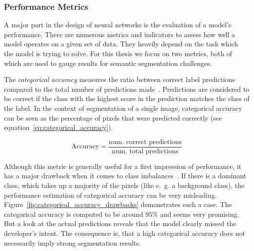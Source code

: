 \subsubsection{Performance Metrics}
\label{sec:metrics}
A major part in the design of neural networks is the evaluation of a model's performance. There are numerous metrics and indicators to assess how well a model operates on a given set of data. They heavily depend on the task which the model is trying to solve. For this thesis we focus on two metrics, both of which are used to gauge results for semantic segmentation challenges.

The \emph{categorical accuracy} measures the ratio between correct label predictions compared to the total number of predictions made~\cite{tf_whitepaper15}. Predictions are considered to be correct if the class with the highest score in the prediction matches the class of the label. In the context of segmentation of a single image, categorical accuracy can be seen as the percentage of pixels that were predicted correctly (see equation~\ref{eq:categorical_accuracy}).

\begin{equation}
    \label{eq:categorical_accuracy}
    \text{Accuracy} = \frac{\text{num. correct predictions}}{\text{num. total predictions}}
\end{equation}

Although this metric is generally useful for a first impression of performance, it has a major drawback when it comes to class imbalances~\cite{tds_segmentation18}. If there is a dominant class, which takes up a majority of the pixels (like e.~g. a background class), the performance estimation of categorical accuracy can be very misleading. Figure~\ref{fig:categorical_accuracy_drawbacks} demonstrates such a case. The categorical accuracy is computed to be around $95\%$ and seems very promising. But a look at the actual predictions reveals that the model clearly missed the developer's intent. The consequence is, that a high categorical accuracy does not necessarily imply strong segmentation results.

